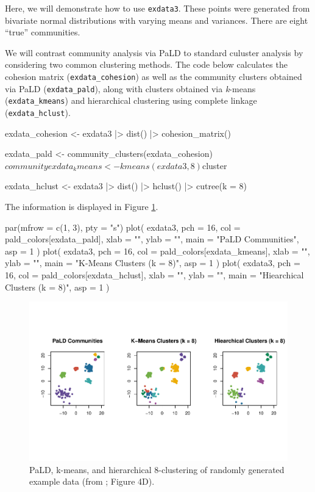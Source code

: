 Here, we will demonstrate how to use \texttt{exdata3}. These points were
generated from bivariate normal distributions with varying means and
variances. There are eight ``true'' communities.

We will contrast community analysis via PaLD to standard culuster
analysis by considering two common clustering methods. The code below
calculates the cohesion matrix (\texttt{exdata\_cohesion}) as well as
the community clusters obtained via PaLD (\texttt{exdata\_pald}), along
with clusters obtained via \emph{k}-means (\texttt{exdata\_kmeans}) and
hierarchical clustering using complete linkage
(\texttt{exdata\_hclust}).

\begin{Schunk}
\begin{Sinput}
exdata_cohesion <- exdata3 |>
  dist() |>
  cohesion_matrix()

exdata_pald <- community_clusters(exdata_cohesion)$community

exdata_kmeans <- kmeans(exdata3, 8)$cluster

exdata_hclust <- exdata3 |>
  dist() |>
  hclust() |>
  cutree(k = 8) 
\end{Sinput}
\end{Schunk}

The information is displayed in Figure \ref{fig:fig5}.

\begin{Schunk}
\begin{Sinput}
par(mfrow = c(1, 3), pty = "s")
plot(
  exdata3,
  pch = 16,
  col = pald_colors[exdata_pald],
  xlab = "",
  ylab = "",
  main = "PaLD Communities",
  asp = 1
)
plot(
  exdata3,
  pch = 16,
  col = pald_colors[exdata_kmeans],
  xlab = "",
  ylab = "",
  main = "K-Means Clusters (k = 8)",
  asp = 1
)
plot(
  exdata3,
  pch = 16,
  col = pald_colors[exdata_hclust],
  xlab = "",
  ylab = "",
  main = "Hiearchical Clusters (k = 8)",
  asp = 1
)
\end{Sinput}
\begin{figure}
\includegraphics{dagostino-mcgowan_files/figure-latex/fig5-1} \caption[PaLD, k-means, and hierarchical 8-clustering of randomly generated example data (from \citet{berenhaut2022social}]{PaLD, k-means, and hierarchical 8-clustering of randomly generated example data (from \citet{berenhaut2022social}; Figure 4D).}\label{fig:fig5}
\end{figure}
\end{Schunk}

